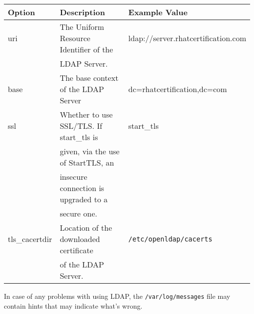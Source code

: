 \noindent
\begin{tabular}{lll}
	\toprule
	\textbf{Option} &\textbf{Description} &\textbf{Example Value}\\
	\midrule
	uri &The Uniform Resource Identifier of the  &ldap://server.rhatcertification.com \\
	&LDAP Server. & \\
	base &The base context of the LDAP Server &dc=rhatcertification,dc=com \\
	ssl &Whether to use SSL/TLS. If start\_tls is &start\_tls \\
	&given, via the use of StartTLS, an & \\
	&insecure connection is upgraded to a &\\
	& secure one. &\\
	tls\_cacertdir &Location of the downloaded certificate &\verb|/etc/openldap/cacerts| \\
	&of the LDAP Server. &\\
	\bottomrule
\end{tabular}

In case of any problems with using LDAP, the \verb|/var/log/messages| file may contain hints that may indicate what's wrong. 